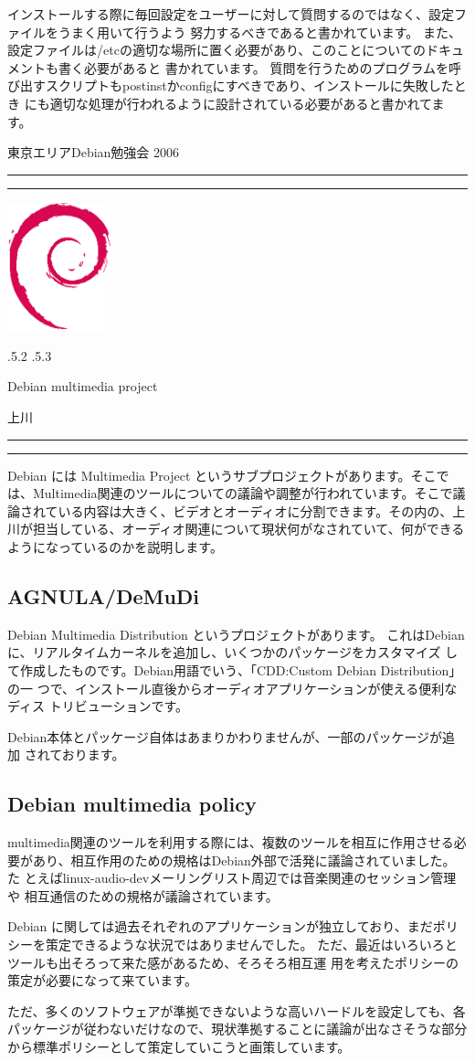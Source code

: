 \documentclass[mingoth,a4paper]{jsarticle}
\makeatletter
\renewcommand{\section}{\@startsection{section}{1}{\z@}%
    {\Cvs \@plus.5\Cdp \@minus.2\Cdp}%
    {.5\Cvs \@plus.3\Cdp}%
    {\normalfont\Large\headfont\raggedright\centering}} %
\newcommand{\dancersection}[2]{%
\newpage
東京エリアDebian勉強会 2006
\hrule
\vspace{0.5mm}
\hrule
\hfill{}\includegraphics[width=3cm]{image200502/openlogo-nd.eps}\\
\vspace{-4cm}
\begin{center}
  \section{#1}
\end{center}
\hfill{}#2\hspace{3cm}\space\\
\hrule
\hrule
\vspace{1cm}
}
\makeatother
\begin{document}
インストールする際に毎回設定をユーザーに対して質問するのではなく、設定ファイルをうまく用いて行うよう
努力するべきであると書かれています。
また、設定ファイルは/etcの適切な場所に置く必要があり、このことについてのドキュメントも書く必要があると
書かれています。
質問を行うためのプログラムを呼び出すスクリプトもpostinstかconfigにすべきであり、インストールに失敗したとき
にも適切な処理が行われるように設計されている必要があると書かれてます。


\dancersection{Debian multimedia project}{上川}
\label{sec:uekawa}

Debian には Multimedia Project というサブプロジェクトがあります。そこで
は、Multimedia関連のツールについての議論や調整が行われています。そこで議
論されている内容は大きく、ビデオとオーディオに分割できます。その内の、上
川が担当している、オーディオ関連について現状何がなされていて、何ができる
ようになっているのかを説明します。

\subsection{AGNULA/DeMuDi}

Debian Multimedia Distribution というプロジェクトがあります。
これはDebian に、リアルタイムカーネルを追加し、いくつかのパッケージをカスタマイズ
して作成したものです。Debian用語でいう、「CDD:Custom Debian Distribution」の一
つで、インストール直後からオーディオアプリケーションが使える便利なディス
トリビューションです。

Debian本体とパッケージ自体はあまりかわりませんが、一部のパッケージが追加
されております。

\subsection{Debian multimedia policy}

multimedia関連のツールを利用する際には、複数のツールを相互に作用させる必
要があり、相互作用のための規格はDebian外部で活発に議論されていました。た
とえばlinux-audio-devメーリングリスト周辺では音楽関連のセッション管理や
相互通信のための規格が議論されています。

Debian に関しては過去それぞれのアプリケーションが独立しており、まだポリ
シーを策定できるような状況ではありませんでした。
ただ、最近はいろいろとツールも出そろって来た感があるため、そろそろ相互運
用を考えたポリシーの策定が必要になって来ています。

ただ、多くのソフトウェアが準拠できないような高いハードルを設定しても、各
パッケージが従わないだけなので、現状準拠することに議論が出なさそうな部分
から標準ポリシーとして策定していこうと画策しています。
\end{document}
